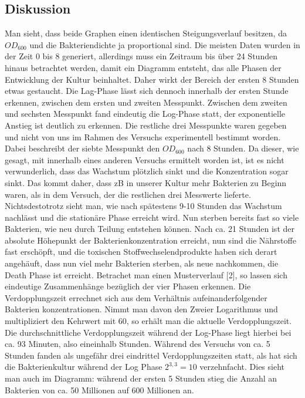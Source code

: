 \documentclass[12pt,twoside]{article}
\begin{document}
\subsection{Diskussion}
Man sieht, dass beide Graphen einen identischen Steigungsverlauf besitzen, da $OD_{600}$ und die Bakteriendichte ja proportional sind. Die meisten Daten wurden in der Zeit 0 bis 8 generiert, allerdings muss ein Zeitraum bis über 24 Stunden hinaus betrachtet werden, damit ein Diagramm entsteht, das alle Phasen der Entwicklung der Kultur beinhaltet. Daher wirkt der Bereich der ersten 8 Stunden etwas gestaucht. Die Lag-Phase lässt sich dennoch innerhalb der ersten Stunde erkennen, zwischen dem ersten und zweiten Messpunkt. Zwischen dem zweiten und sechsten Messpunkt fand eindeutig die Log-Phase statt, der exponentielle Anstieg ist deutlich zu erkennen. Die restliche drei Messpunkte waren gegeben und nicht von uns im Rahmen des Versuchs experimentell bestimmt worden. Dabei beschreibt der siebte Messpunkt den $OD_{600}$ nach 8 Stunden. Da dieser, wie gesagt, mit innerhalb eines anderen Versuchs ermittelt worden ist, ist es nicht verwunderlich, dass das Wachstum plötzlich sinkt und die Konzentration sogar sinkt. Das kommt daher, dass zB in unserer Kultur mehr Bakterien zu Beginn waren, als in dem Versuch, der die restlichen drei Messwerte lieferte. Nichtsdestotrotz sieht man, wie nach spätestens 9-10 Stunden das Wachstum nachlässt und die stationäre Phase erreicht wird. Nun sterben bereits fast so viele Bakterien, wie neu durch Teilung entstehen können. Nach ca. 21 Stunden ist der absolute Höhepunkt der Bakterienkonzentration erreicht, nun sind die Nährstoffe fast erschöpft, und die toxischen Stoffwechselendprodukte haben sich derart angehäuft, dass nun viel mehr Bakterien sterben, als neue nachkommen, die Death Phase ist erreicht. Betrachet man einen Musterverlauf [2], so lassen sich eindeutige Zusammenhänge bezüglich der vier Phasen erkennen.\newline
Die Verdopplungszeit errechnet sich aus dem Verhältnis aufeinanderfolgender Bakterien konzentrationen. Nimmt man davon den Zweier Logarithmus und multipliziert den Kehrwert mit 60, so erhält man die aktuelle Verdopplungszeit. Die durchschnittliche Verdopplungszeit während der Log-Phase liegt hierbei bei ca. 93 Minuten, also eineinhalb Stunden. Während des Versuchs von ca. 5 Stunden fanden als ungefähr drei eindrittel Verdopplungszeiten statt, als hat sich die Bakterienkultur während der Log Phase $2^{3,3} = 10$ verzehnfacht. Dies sieht man auch im Diagramm: während der ersten 5 Stunden stieg die Anzahl an Bakterien von ca. 50 Millionen auf 600 Millionen an.
\end{document}

